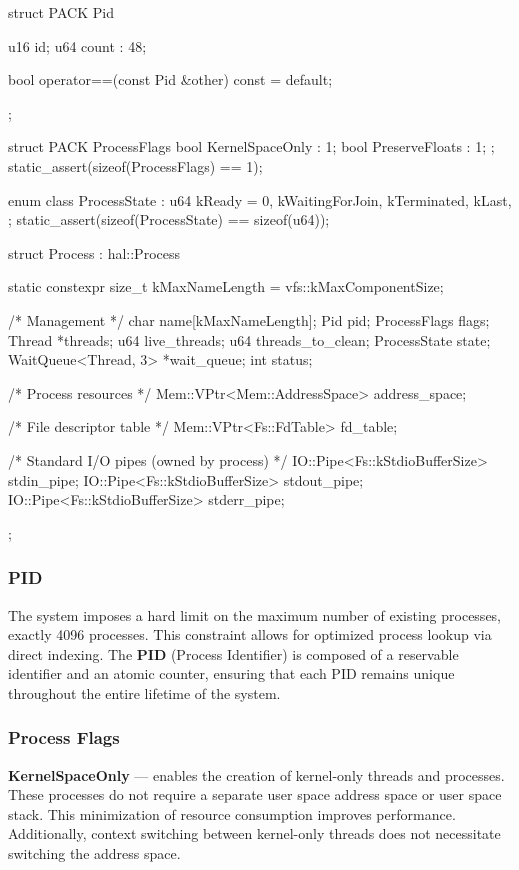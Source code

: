\documentclass[a4paper,10pt,twoside]{report}
\theoremstyle{definition}
\begin{document}
\begin{cppcode}[caption={Process Structure}, label={lst:processStruct}]
struct PACK Pid {
    u16 id;
    u64 count : 48;

    bool operator==(const Pid &other) const = default;
};

struct PACK ProcessFlags {
    bool KernelSpaceOnly : 1;
    bool PreserveFloats : 1;
};
static_assert(sizeof(ProcessFlags) == 1);

enum class ProcessState : u64 {
    kReady = 0,
    kWaitingForJoin,
    kTerminated,
    kLast,
};
static_assert(sizeof(ProcessState) == sizeof(u64));

struct Process : hal::Process {
    static constexpr size_t kMaxNameLength = vfs::kMaxComponentSize;

    /* Management */
    char name[kMaxNameLength];
    Pid pid;
    ProcessFlags flags;
    Thread *threads;
    u64 live_threads;
    u64 threads_to_clean;
    ProcessState state;
    WaitQueue<Thread, 3> *wait_queue;
    int status;

    /* Process resources */
    Mem::VPtr<Mem::AddressSpace> address_space;

    /* File descriptor table */
    Mem::VPtr<Fs::FdTable> fd_table;

    /* Standard I/O pipes (owned by process) */
    IO::Pipe<Fs::kStdioBufferSize> stdin_pipe;
    IO::Pipe<Fs::kStdioBufferSize> stdout_pipe;
    IO::Pipe<Fs::kStdioBufferSize> stderr_pipe;
};
\end{cppcode}

\subsubsection{PID}
\label{subsubsec:pid}

The system imposes a hard limit on the maximum number of existing processes, exactly 4096 processes. This constraint allows for optimized process lookup via direct indexing. The \textbf{PID} (Process Identifier) is composed of a reservable identifier and an atomic counter, ensuring that each PID remains unique throughout the entire lifetime of the system.

\subsubsection{Process Flags}

\textbf{KernelSpaceOnly} --- enables the creation of kernel-only threads and processes. These processes do not require a separate user space address space or user space stack. This minimization of resource consumption improves performance. Additionally, context switching between kernel-only threads does not necessitate switching the address space.
\end{document}
